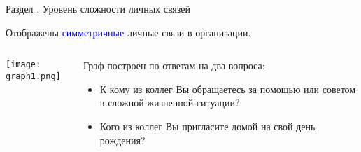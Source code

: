 \begin{frame}{Раздел . Уровень сложности личных связей}

Отображены \textcolor{blue}{симметричные} личные связи в организации.

\begin{columns}[T] %
\begin{column}{0.7\textwidth} 
\centering
          \texttt{[image: graph1.png]}
\end{column}
\begin{column}{0.3\textwidth} 
\tiny
Граф построен по ответам на два вопроса:
\begin{itemize}
\item К кому из коллег Вы обращаетесь за помощью или советом в сложной жизненной ситуации?
\item Кого из коллег Вы пригласите домой на свой день рождения?
\end{itemize}
\end{column}
\end{columns}
\end{frame}


